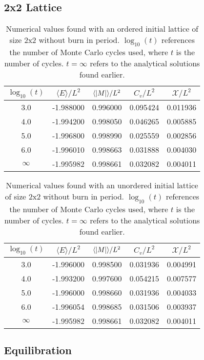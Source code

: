 \documentclass[%
reprint,
nofootinbib,
amsmath,amssymb,
aps,
]{revtex4-1}
\begin{document}
\subsection{2x2 Lattice} %
\begin{table}[H]
	\centering
	\caption{Numerical values found with an ordered initial lattice of size 2x2 without burn in period. $\log_{10}(t)$ references the number of Monte Carlo cycles used, where $t$ is the number of cycles. $ t = \infty$ refers to the analytical solutions found earlier.}
	\label{tab:tableordered}
	\begin{tabular}{|c|c|c|c|c|}
		\hline
		$\log_{10}(t)$ & $\langle E \rangle / L^2$ & $\langle \abs{M}\rangle / L^2$ & $C_v/L^2$ & $\mathcal{X}/L^2$\\
		\hline
		3.0 & -1.988000 &0.996000 &0.095424 &0.011936 \\
		4.0 & -1.994200 &0.998050 &0.046265 &0.005885 \\
		5.0 & -1.996800 &0.998990 &0.025559 &0.002856 \\
		6.0 & -1.996010 &0.998663 &0.031888 &0.004030 \\
		\hline
		$\infty$& -1.995982 & 0.998661 & 0.032082 & 0.004011\\
		\hline
	\end{tabular}
\end{table}
\begin{table}[H]
	\centering
	\caption{Numerical values found with an unordered initial lattice of size 2x2 without burn in period. $\log_{10}(t)$ references the number of Monte Carlo cycles used, where $t$ is the number of cycles. $ t = \infty$ refers to the analytical solutions found earlier.}
	\label{tab:tableunordered}
	\begin{tabular}{|c|c|c|c|c|}
		\hline
		$\log_{10}(t)$ & $\langle E \rangle / L^2$ & $\langle \abs{M}\rangle / L^2$ & $C_v/L^2$ & $\mathcal{X}/L^2$\\
		\hline
		3.0 & -1.996000 &0.998500 &0.031936 &0.004991 \\
		4.0 & -1.993200 &0.997600 &0.054215 &0.007577 \\
		5.0 & -1.996000 &0.998660 &0.031936 &0.004033 \\
		6.0 & -1.996054 &0.998685 &0.031506 &0.003937 \\
		\hline
		$\infty$& -1.995982 & 0.998661 & 0.032082 & 0.004011\\
		\hline
	\end{tabular}
\end{table}
\subsection{Equilibration} %
\end{document}
